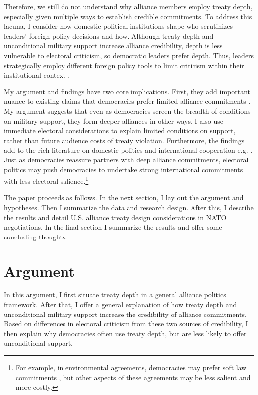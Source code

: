 \documentclass[12pt]{article}
\begin{document}
Therefore, we still do not understand why alliance members employ treaty depth, especially given multiple ways to establish credible commitments. 
To address this lacuna, I consider how domestic political institutions shape who scrutinizes leaders' foreign policy decisions and how.
Although treaty depth and unconditional military support increase alliance credibility, depth is less vulnerable to electoral criticism, so democratic leaders prefer depth. 
Thus, leaders strategically employ different foreign policy tools to limit criticism within their institutional context \citep{HydeSaunders2020}. 


My argument and findings have two core implications. 
First, they add important nuance to existing claims that democracies prefer limited alliance commitments \citep{Mattes2012, Chibaetal2015, FjelstulReiter2019}. 
My argument suggests that even as democracies screen the breadth of conditions on military support, they form deeper alliances in other ways.
I also use immediate electoral considerations to explain limited conditions on support, rather than future audience costs of treaty violation.
Furthermore, the findings add to the rich literature on domestic politics and international cooperation e.g. \citep{DownesRocke1995, Fearon1998, Leeds1999, MattesRodriguez2014}. 
Just as democracies reassure partners with deep alliance commitments, electoral politics may push democracies to undertake strong international commitments with less electoral salience.\footnote{For example, in environmental agreements, democracies may prefer soft law commitments \citep{BoehmeltButkute2018}, but other aspects of these agreements may be less salient and more costly.} 


The paper proceeds as follows. 
In the next section, I lay out the argument and hypotheses. 
Then I summarize the data and research design. 
After this, I describe the results and detail U.S. alliance treaty design considerations in NATO negotiations.
In the final section I summarize the results and offer some concluding thoughts. 


\section{Argument}


In this argument, I first situate treaty depth in a general alliance politics framework.  
After that, I offer a general explanation of how treaty depth and unconditional military support increase the credibility of alliance commitments. 
Based on differences in electoral criticism from these two sources of credibility, I then explain why democracies often use treaty depth, but are less likely to offer unconditional support. 
\end{document}
